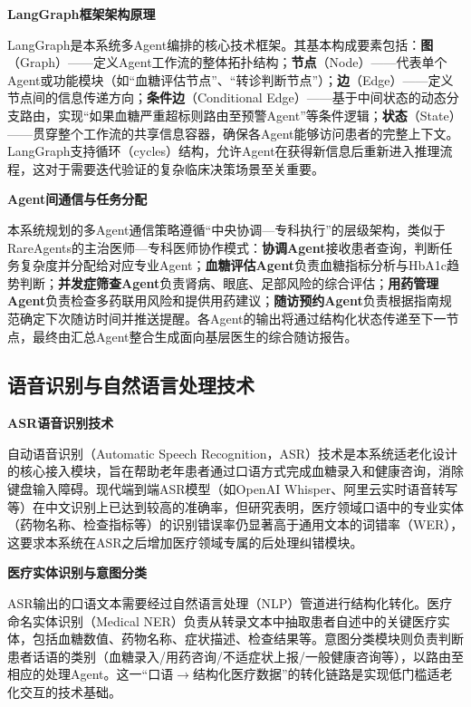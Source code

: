 \noindent\textbf{LangGraph框架架构原理}

LangGraph是本系统多Agent编排的核心技术框架。其基本构成要素包括：\textbf{图}（Graph）------定义Agent工作流的整体拓扑结构；\textbf{节点}（Node）------代表单个Agent或功能模块（如``血糖评估节点''、``转诊判断节点''）；\textbf{边}（Edge）------定义节点间的信息传递方向；\textbf{条件边}（Conditional Edge）------基于中间状态的动态分支路由，实现``如果血糖严重超标则路由至预警Agent''等条件逻辑；\textbf{状态}（State）------贯穿整个工作流的共享信息容器，确保各Agent能够访问患者的完整上下文。LangGraph支持循环（cycles）结构，允许Agent在获得新信息后重新进入推理流程，这对于需要迭代验证的复杂临床决策场景至关重要\todocite{}\todocite{}\todocite{}\todocite{}。

\noindent\textbf{Agent间通信与任务分配}

本系统规划的多Agent通信策略遵循``中央协调---专科执行''的层级架构，类似于RareAgents的主治医师---专科医师协作模式：\textbf{协调Agent}接收患者查询，判断任务复杂度并分配给对应专业Agent；\textbf{血糖评估Agent}负责血糖指标分析与HbA1c趋势判断；\textbf{并发症筛查Agent}负责肾病、眼底、足部风险的综合评估；\textbf{用药管理Agent}负责检查多药联用风险和提供用药建议；\textbf{随访预约Agent}负责根据指南规范确定下次随访时间并推送提醒。各Agent的输出将通过结构化状态传递至下一节点，最终由汇总Agent整合生成面向基层医生的综合随访报告\todocite{}\todocite{}\todocite{}。

\subsection{语音识别与自然语言处理技术}

\noindent\textbf{ASR语音识别技术}

自动语音识别（Automatic Speech Recognition，ASR）技术是本系统适老化设计的核心接入模块，旨在帮助老年患者通过口语方式完成血糖录入和健康咨询，消除键盘输入障碍。现代端到端ASR模型（如OpenAI Whisper、阿里云实时语音转写等）在中文识别上已达到较高的准确率，但研究表明，医疗领域口语中的专业实体（药物名称、检查指标等）的识别错误率仍显著高于通用文本的词错率（WER），这要求本系统在ASR之后增加医疗领域专属的后处理纠错模块\todocite{}。

\noindent\textbf{医疗实体识别与意图分类}

ASR输出的口语文本需要经过自然语言处理（NLP）管道进行结构化转化。医疗命名实体识别（Medical NER）负责从转录文本中抽取患者自述中的关键医疗实体，包括血糖数值、药物名称、症状描述、检查结果等。意图分类模块则负责判断患者话语的类别（血糖录入/用药咨询/不适症状上报/一般健康咨询等），以路由至相应的处理Agent。这一``口语$\to$结构化医疗数据''的转化链路是实现低门槛适老化交互的技术基础\todocite{}\todocite{}。

